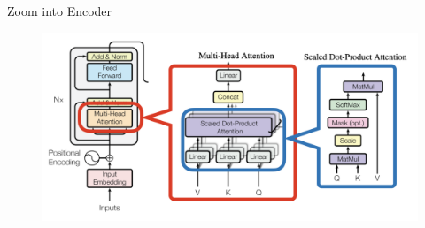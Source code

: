 \documentclass{beamer}
\begin{document}
\begin{frame}{Zoom into Encoder}\renewcommand{\thefootnote}{}
\renewcommand{\thefootnote}{\arabic{footnote}}
\begin{figure} 
    \centering
    \includegraphics[width=1\linewidth]{f15.png}
    \label{fig:enter-label}
\end{figure}
\end{frame}
\end{document}
